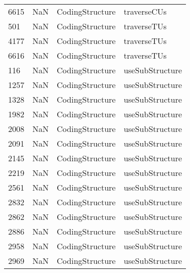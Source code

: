 \begin{tabular}{llll}
6615 &                   NaN &            CodingStructure &                               traverseCUs \\
501  &                   NaN &            CodingStructure &                               traverseTUs \\
4177 &                   NaN &            CodingStructure &                               traverseTUs \\
6616 &                   NaN &            CodingStructure &                               traverseTUs \\
116  &                   NaN &            CodingStructure &                           useSubStructure \\
1257 &                   NaN &            CodingStructure &                           useSubStructure \\
1328 &                   NaN &            CodingStructure &                           useSubStructure \\
1982 &                   NaN &            CodingStructure &                           useSubStructure \\
2008 &                   NaN &            CodingStructure &                           useSubStructure \\
2091 &                   NaN &            CodingStructure &                           useSubStructure \\
2145 &                   NaN &            CodingStructure &                           useSubStructure \\
2219 &                   NaN &            CodingStructure &                           useSubStructure \\
2561 &                   NaN &            CodingStructure &                           useSubStructure \\
2832 &                   NaN &            CodingStructure &                           useSubStructure \\
2862 &                   NaN &            CodingStructure &                           useSubStructure \\
2886 &                   NaN &            CodingStructure &                           useSubStructure \\
2958 &                   NaN &            CodingStructure &                           useSubStructure \\
2969 &                   NaN &            CodingStructure &                           useSubStructure \\

\end{tabular}
